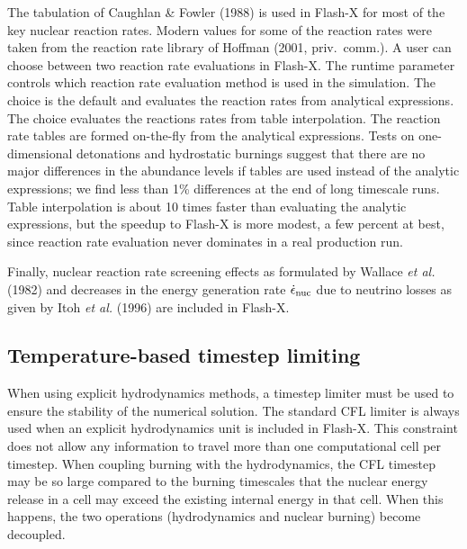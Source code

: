 The tabulation of Caughlan \& Fowler (1988) is used in Flash-X for most
of the key nuclear reaction rates.  Modern values for some of the
reaction rates were taken from the reaction rate library of Hoffman
(2001, priv.\ comm.).  A user can choose between two reaction rate
evaluations in Flash-X.  The runtime parameter  controls
which reaction rate evaluation method is used in the simulation. The
choice  is the default and evaluates the
reaction rates from analytical expressions.  The choice  evaluates the reactions rates from table interpolation. The
reaction rate tables are formed on-the-fly from the analytical
expressions.  Tests on one-dimensional detonations and hydrostatic
burnings suggest that there are no major differences in the abundance
levels if tables are used instead of the analytic expressions; we find
less than 1\% differences at the end of long timescale runs.  Table
interpolation is about 10 times faster than evaluating the analytic
expressions, but the speedup to Flash-X is more modest, a few percent at
best, since reaction rate evaluation never dominates in a real
production run.

Finally, nuclear reaction rate screening effects as formulated by
Wallace {\it et al.} (1982) and decreases in the energy generation rate
$\dot {\epsilon}_{\rm nuc}$ due to neutrino losses as given by Itoh {\it et
al.} (1996) are included in Flash-X.

\subsection{Temperature-based timestep limiting}

When using explicit hydrodynamics methods, a timestep
limiter must be used to ensure the stability of the numerical solution.
The standard CFL limiter is always used when an explicit hydrodynamics
unit is included in Flash-X.  This constraint does not allow any
information to travel more than one computational cell per timestep.
When coupling burning with the hydrodynamics, the CFL timestep may be so
large compared to the burning timescales that the nuclear energy
release in a cell may exceed the existing internal energy in that
cell.  When this happens, the two operations (hydrodynamics and
nuclear burning) become decoupled.

